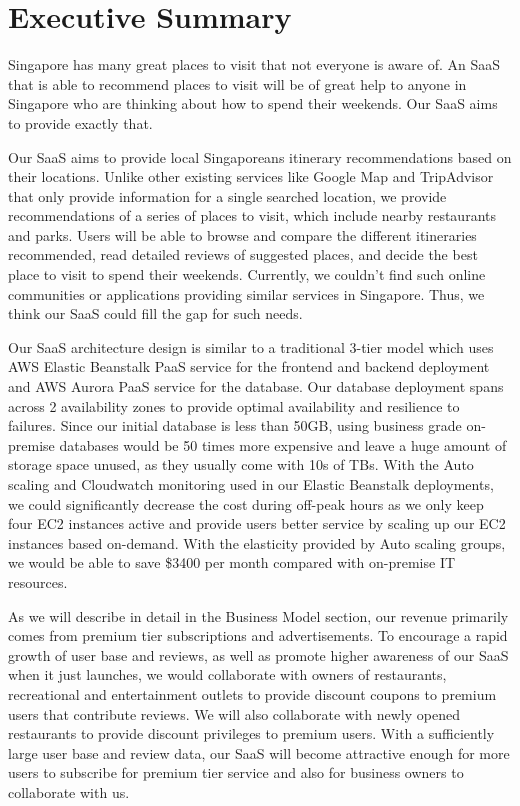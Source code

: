 \documentclass[12pt,a4paper]{article}
\begin{document}

\newpage
\setcounter{page}{1}

\section{Executive Summary}

Singapore has many great places to visit that not everyone is aware of. An SaaS that is able to recommend places to visit will be of great help to anyone in Singapore who are thinking about how to spend their weekends. Our SaaS aims to provide exactly that.

Our SaaS aims to provide local Singaporeans itinerary recommendations based on their locations. Unlike other existing services like Google Map and TripAdvisor that only provide information for a single searched location, we provide recommendations of a series of places to visit, which include nearby restaurants and parks. Users will be able to browse and compare the different itineraries recommended, read detailed reviews of suggested places, and decide the best place to visit to spend their weekends. Currently, we couldn’t find such online communities or applications providing similar services in Singapore. Thus, we think our SaaS could fill the gap for such needs.

Our SaaS architecture design is similar to a traditional 3-tier model which uses AWS Elastic Beanstalk PaaS service for the frontend and backend deployment and AWS Aurora PaaS service for the database. Our database deployment spans across 2 availability zones to provide optimal availability and resilience to failures. Since our initial database is less than 50GB, using business grade on-premise databases would be 50 times more expensive and leave a huge amount of storage space unused, as they usually come with 10s of TBs. With the Auto scaling and Cloudwatch monitoring used in our Elastic Beanstalk deployments, we could significantly decrease the cost during off-peak hours as we only keep four EC2 instances active and provide users better service by scaling up our EC2 instances based on-demand. With the elasticity provided by Auto scaling groups, we would be able to save \$3400 per month compared with on-premise IT resources.

As we will describe in detail in the Business Model section, our revenue primarily comes from premium tier subscriptions and advertisements. To encourage a rapid growth of user base and reviews, as well as promote higher awareness of our SaaS when it just launches, we would collaborate with owners of restaurants, recreational and entertainment outlets to provide discount coupons to premium users that contribute reviews. We will also collaborate with newly opened restaurants to provide discount privileges to premium users. With a sufficiently large user base and review data, our SaaS will become attractive enough for more users to subscribe for premium tier service and also for business owners to collaborate with us.
\end{document}
